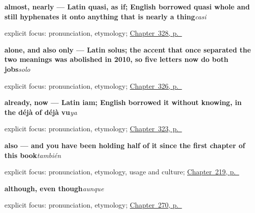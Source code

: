 \noindent\begin{minipage}[t]{\linewidth}
\raggedright
\textbf{almost, nearly — Latin quasi, as if; English borrowed quasi whole and still hyphenates it onto anything that is nearly a thing}\enspace\emph{casi}\par
\footnotesize explicit focus: pronunciation, etymology; \hyperref[ch:asi-y-incluso]{Chapter~328, p.~\pageref*{ch:asi-y-incluso}}
\end{minipage}\par\smallskip

\noindent\begin{minipage}[t]{\linewidth}
\raggedright
\textbf{alone, and also only — Latin solus; the accent that once separated the two meanings was abolished in 2010, so five letters now do both jobs}\enspace\emph{solo}\par
\footnotesize explicit focus: pronunciation, etymology; \hyperref[ch:nervioso-y-listo]{Chapter~326, p.~\pageref*{ch:nervioso-y-listo}}
\end{minipage}\par\smallskip

\noindent\begin{minipage}[t]{\linewidth}
\raggedright
\textbf{already, now — Latin iam; English borrowed it without knowing, in the déjà of déjà vu}\enspace\emph{ya}\par
\footnotesize explicit focus: pronunciation, etymology; \hyperref[ch:antes-y-despues]{Chapter~323, p.~\pageref*{ch:antes-y-despues}}
\end{minipage}\par\smallskip

\noindent\begin{minipage}[t]{\linewidth}
\raggedright
\textbf{also — and you have been holding half of it since the first chapter of this book}\enspace\emph{también}\par
\footnotesize explicit focus: pronunciation, etymology, usage and culture; \hyperref[ch:tambien]{Chapter~219, p.~\pageref*{ch:tambien}}
\end{minipage}\par\smallskip

\noindent\begin{minipage}[t]{\linewidth}
\raggedright
\textbf{although, even though}\enspace\emph{aunque}\par
\footnotesize explicit focus: pronunciation, etymology; \hyperref[ch:argumentar]{Chapter~270, p.~\pageref*{ch:argumentar}}
\end{minipage}\par\smallskip

